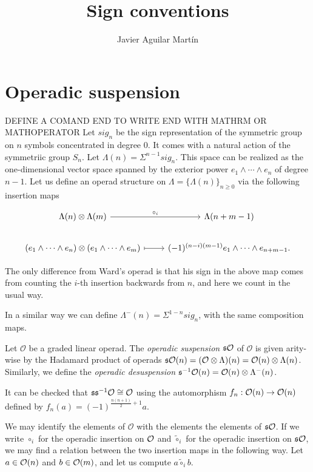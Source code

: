 \documentclass[twoside]{article}
\begin{document}
\title{Sign conventions}
\author{Javier Aguilar Martín}
\maketitle

\section{Operadic suspension}
DEFINE A COMAND END TO WRITE END WITH MATHRM OR MATHOPERATOR
Let $sig_n$ be the sign representation of the symmetric group on $n$ symbols concentrated in degree 0. It comes with a natural action of the symmetriic group $S_n$. Let $\Lambda(n)=\Sigma^{n-1}sig_n$. This space can be realized as the one-dimensional vector space spanned by the exterior power $e_1\land\cdots\land e_n$ of degree $n-1$. Let us define an operad structure on $\Lambda=\{\Lambda(n)\}_{n\geq 0}$ via the following insertion maps

\[
\begin{tikzcd}
\Lambda(n)\otimes\Lambda(m) \arrow[r, "\circ_i"] & \Lambda(n+m-1)\\
(e_1\land\cdots\land e_n)\otimes(e_1\land\cdots\land e_m)\arrow[r, mapsto] & (-1)^{(n-i)(m-1)}e_1\land\cdots\land e_{n+m-1}.
\end{tikzcd}
\]

The only difference from Ward's operad is that his sign in the above map comes from counting the $i$-th insertion backwards from $n$, and here we count in the usual way. 

In a similar way we can define $\Lambda^-(n)=\Sigma^{1-n}sig_n$, with the same composition maps.

\begin{definition}
Let $\mathcal{O}$ be a graded linear operad. The \emph{operadic suspension} $\mathfrak{s}{\mathcal O}$ of $\mathcal{O}$ is given arity-wise by the Hadamard product of operads $\mathfrak{s}{\mathcal O}(n)=(\mathcal{O}\otimes\Lambda)(n)=\mathcal{O}(n)\otimes\Lambda(n)$. Similarly, we define the \emph{operadic desuspension} $\mathfrak{s}^{-1}{\mathcal O}(n)=\mathcal{O}(n)\otimes\Lambda^-(n)$.
\end{definition}

It can be checked that $\mathfrak{s}\mathfrak{s}^{-1}{\mathcal O}\cong{\mathcal O}$ using the automorphism $f_n:{\mathcal O}(n)\to{\mathcal O}(n)$ defined by $f_n(a)=(-1)^{\frac{n(n+1)}{2}+1}a$.

We may identify the elements of $\mathcal{O}$ with the elements the elements of $\mathfrak{s}{\mathcal O}$. If we write $\circ_i$ for the operadic insertion on ${\mathcal O}$ and $\tilde{\circ}_i$ for the operadic insertion on $\mathfrak{s}{\mathcal O}$, we may find a relation between the two insertion maps in the following way. Let $a\in{\mathcal O}(n)$ and $b\in{\mathcal O}(m)$, and let us compute $a\tilde{\circ}_i b$.
\end{document}
